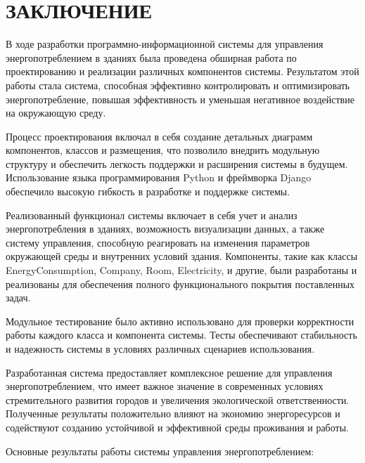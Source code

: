 \section*{ЗАКЛЮЧЕНИЕ}

В ходе разработки программно-информационной системы для управления энергопотреблением в зданиях была проведена обширная работа по проектированию и реализации различных компонентов системы. Результатом этой работы стала система, способная эффективно контролировать и оптимизировать энергопотребление, повышая эффективность и уменьшая негативное воздействие на окружающую среду.

Процесс проектирования включал в себя создание детальных диаграмм компонентов, классов и размещения, что позволило внедрить модульную структуру и обеспечить легкость поддержки и расширения системы в будущем. Использование языка программирования Python и фреймворка Django обеспечило высокую гибкость в разработке и поддержке системы.

Реализованный функционал системы включает в себя учет и анализ энергопотребления в зданиях, возможность визуализации данных, а также систему управления, способную реагировать на изменения параметров окружающей среды и внутренних условий здания. Компоненты, такие как классы EnergyConsumption, Company, Room, Electricity, и другие, были разработаны и реализованы для обеспечения полного функционального покрытия поставленных задач.

Модульное тестирование было активно использовано для проверки корректности работы каждого класса и компонента системы. Тесты обеспечивают стабильность и надежность системы в условиях различных сценариев использования.

Разработанная система предоставляет комплексное решение для управления энергопотреблением, что имеет важное значение в современных условиях стремительного развития городов и увеличения экологической ответственности. Полученные результаты положительно влияют на экономию энергоресурсов и содействуют созданию устойчивой и эффективной среды проживания и работы.

Основные результаты работы системы управления энергопотреблением:

